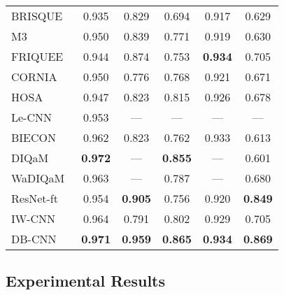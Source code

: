\documentclass[journal]{IEEEtran}
\begin{document}
\begin{table}[t]
\begin{tabular}{l|ccccc}
      BRISQUE~\cite{mittal2012no} & 0.935 & 0.829 & 0.694 & 0.917 & 0.629  \\
      M3~\cite{xue2014blind}& 0.950 & 0.839 & 0.771 & 0.919 & 0.630 \\
FRIQUEE~\cite{ghadiyaram2017perceptual} & 0.944 & 0.874 & 0.753 & {\bf 0.934} & 0.705\\
      CORNIA~\cite{ye2012unsupervised} & 0.950 & 0.776 & 0.768 & 0.921 & 0.671 \\
      HOSA~\cite{xu2016blind} & 0.947 & 0.823 & 0.815 & 0.926 & 0.678 \\
      Le-CNN~\cite{kang2014convolutional} &0.953 & --- & --- & --- & --- \\
BIECON~\cite{kim2017fully} & 0.962 & 0.823 & 0.762 & 0.933 & 0.613 \\
            DIQaM~\cite{bosse2016deep} & {\bf 0.972} & --- & {\bf 0.855} & --- & 0.601 \\
            WaDIQaM~\cite{bosse2016deep} & 0.963 & --- & 0.787 & --- & 0.680 \\
            ResNet-ft~\cite{kim2017deep} & 0.954 & {\bf 0.905} & 0.756 & 0.920 & {\bf 0.849} \\
            IW-CNN~\cite{kim2017deep} & 0.964 & 0.791 & 0.802 & 0.929 & 0.705 \\
     \hline
        DB-CNN& {\bf 0.971} & {\bf 0.959} & {\bf 0.865} & {\bf 0.934} &{\bf 0.869} \\
     \bottomrule
   \end{tabular}
\end{table}



\subsection{Experimental Results}\label{subsec:exp results}
\end{document}
